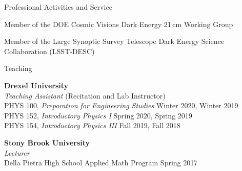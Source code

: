 \documentclass{resume} %
\newcommand{\forceindent}{\leavevmode{\parindent=1em\indent}}
\begin{document}

\begin{rSection}{Professional Activities and Service}

\begin{description}[leftmargin=10em, style=nextline]

\item[Working Groups] Member of the DOE Cosmic Visions Dark Energy 21$\,$cm Working 
 Group

\item[Collaborations] Member of the Large Synoptic Survey Telescope Dark Energy 
 Science Collaboration (LSST-DESC)

\end{description}

\end{rSection}


\begin{rSection}{Teaching}

\textbf{Drexel University} \\ 
\textit{Teaching Assistant} (Recitation and Lab Instructor)\\
\forceindent PHYS 100, \textit{Preparation for Engineering Studies}  \hfill {Winter 2020, Winter 2019}\\
\forceindent PHYS 152, \textit{Introductory Physics I}  \hfill {Spring 2020, Spring 2019}\\
\forceindent PHYS 154, \textit{Introductory Physics III}  \hfill {Fall 2019, Fall 2018}

\textbf{Stony Brook University} \\
\textit{Lecturer}\\
\forceindent  Della Pietra High School Applied Math Program \hfill {Spring 2017}

\end{rSection}

\end{document}
